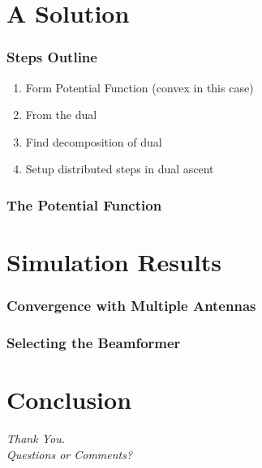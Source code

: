 \documentclass[10pt,tgadventor, onlymath]{beamer}
\begin{document}
\section{A Solution}

\begin{frame}
\frametitle{Steps Outline}
\begin{enumerate}
\item
	Form Potential Function (convex in this case)
\item 
	From the dual
\item 
	Find decomposition of dual
\item
	Setup distributed steps in dual ascent
\end{enumerate}
\end{frame}

\begin{frame}
\frametitle{The Potential Function}

\end{frame}

\section{Simulation Results}
\begin{frame}
\frametitle{Convergence with Multiple Antennas}

\end{frame}

\begin{frame}
\frametitle{Selecting the Beamformer}

\end{frame}

\section{Conclusion}

\begin{frame}
  \centering \Large
  \emph{Thank You.}
  \\
	\bigskip
    \centering \Large
  \emph{Questions or Comments?}

\end{frame}
\end{document}
